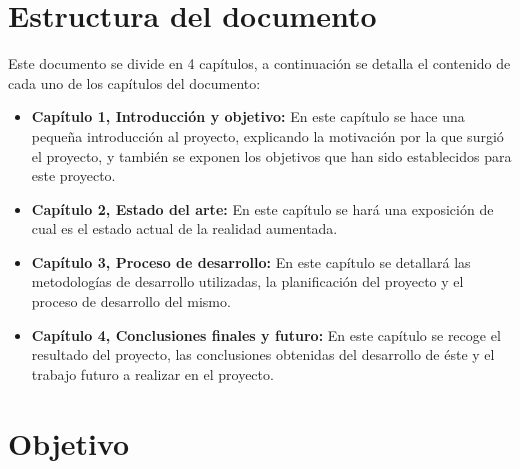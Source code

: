 \section{Estructura del documento}
Este documento se divide en 4 capítulos, a continuación se detalla el contenido de cada uno de los capítulos del documento:
\begin{itemize}
  \item \textbf{Capítulo 1, Introducción y objetivo:} En este capítulo se hace una pequeña introducción al proyecto, explicando la motivación por la que surgió el proyecto, y también se exponen los objetivos que han sido establecidos para este proyecto.
  \item \textbf{Capítulo 2, Estado del arte:} En este capítulo se hará una exposición de cual es el estado actual de la realidad aumentada.
  \item \textbf{Capítulo 3, Proceso de desarrollo:} En este capítulo se detallará las metodologías de desarrollo utilizadas, la planificación del proyecto y el proceso de desarrollo del mismo.
  \item \textbf{Capítulo 4, Conclusiones finales y futuro:} En este capítulo se recoge el resultado del proyecto, las conclusiones obtenidas del desarrollo de éste y el trabajo futuro a realizar en el proyecto.
\end{itemize}

\section{Objetivo}
